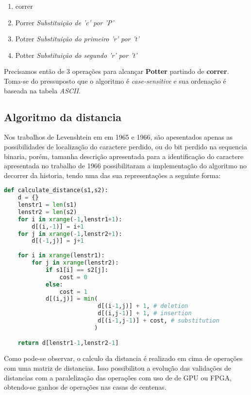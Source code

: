 \begin{enumerate}[start=0]
	\item correr
	\item Porrer \textit{Substituição de 'c' por 'P'}
	\item Potrer \textit{Substituição do primeiro 'r' por 't'}
	\item Potter \textit{Substituição do segundo 'r' por 't'}
\end{enumerate}

Precisamos então de 3 operações para alcançar \textbf{Potter} partindo de \textbf{correr}. Toma-se do pressuposto que o algoritmo é \textit{case-sensitive} e sua ordenação é baseada na tabela \textit{ASCII}.

\subsection{Algoritmo da distancia} %
\label{sub:algoritmo_da_distancia}

Nos trabalhos de Levenshtein em em 1965 e 1966, são apesentados apenas as possibilidades de localização do caractere perdido, ou do bit perdido na sequencia binaria, porém, tamanha descrição apresentada para a identificação do caractere apresentada no trabalho de 1966\cite{levenshtein1966} possibilitaram a implementação do algoritmo no decorrer da historia, tendo uma das sua representações a seguinte forma:


\begin{lstlisting}[language=Python,label=damerau_levenshtein_distance_py,caption={Implementação da distância de Levenshtein}]
def calculate_distance(s1,s2):
    d = {}
    lenstr1 = len(s1)
    lenstr2 = len(s2)
    for i in xrange(-1,lenstr1+1):
        d[(i,-1)] = i+1
    for j in xrange(-1,lenstr2+1):
        d[(-1,j)] = j+1
 
    for i in xrange(lenstr1):
        for j in xrange(lenstr2):
            if s1[i] == s2[j]:
                cost = 0
            else:
                cost = 1
            d[(i,j)] = min(
                           d[(i-1,j)] + 1, # deletion
                           d[(i,j-1)] + 1, # insertion
                           d[(i-1,j-1)] + cost, # substitution
                          )

    return d[lenstr1-1,lenstr2-1]
\end{lstlisting}

Como pode-se observar,  o calculo da distancia é realizado em cima de operações com uma matriz de distancias. Isso possibilitou a evolução das validações de distancias com a paralelização das operações com uso de de GPU ou FPGA, obtendo-se ganhos de operações nas casas de centenas.